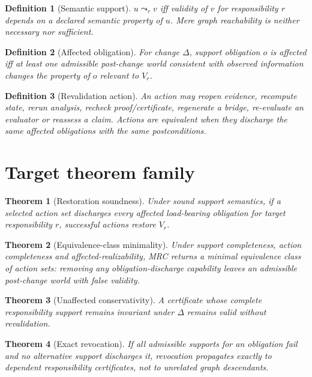 \documentclass[11pt]{article}
\newtheorem{theorem}{Theorem}
\newtheorem{definition}{Definition}
\begin{document}
\begin{definition}[Semantic support]
$u\leadsto_r v$ iff validity of $v$ for responsibility $r$ depends on a declared semantic property of $u$. Mere graph reachability is neither necessary nor sufficient.
\end{definition}

\begin{definition}[Affected obligation]
For change $\Delta$, support obligation $o$ is affected iff at least one admissible post-change world consistent with observed information changes the property of $o$ relevant to $V_r$.
\end{definition}

\begin{definition}[Revalidation action]
An action may reopen evidence, recompute state, rerun analysis, recheck proof/certificate, regenerate a bridge, re-evaluate an evaluator or reassess a claim. Actions are equivalent when they discharge the same affected obligations with the same postconditions.
\end{definition}

\section{Target theorem family}
\begin{theorem}[Restoration soundness]
Under sound support semantics, if a selected action set discharges every affected load-bearing obligation for target responsibility $r$, successful actions restore $V_r$.
\end{theorem}

\begin{theorem}[Equivalence-class minimality]
Under support completeness, action completeness and affected-realizability, MRC returns a minimal equivalence class of action sets: removing any obligation-discharge capability leaves an admissible post-change world with false validity.
\end{theorem}

\begin{theorem}[Unaffected conservativity]
A certificate whose complete responsibility support remains invariant under $\Delta$ remains valid without revalidation.
\end{theorem}

\begin{theorem}[Exact revocation]
If all admissible supports for an obligation fail and no alternative support discharges it, revocation propagates exactly to dependent responsibility certificates, not to unrelated graph descendants.
\end{theorem}
\end{document}
